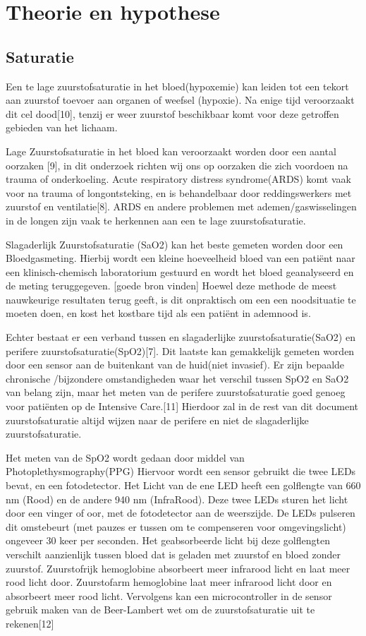 \documentclass[11pt]{article}
\begin{document}
    \section{Theorie en hypothese}\label{sec:theorie-en-hypothese}
    \subsection{Saturatie}
    Een te lage zuurstofsaturatie in het bloed(hypoxemie) kan leiden tot een tekort aan zuurstof toevoer aan organen of weefsel (hypoxie).
    Na enige tijd veroorzaakt dit cel dood[10], tenzij er weer zuurstof beschikbaar komt voor deze getroffen gebieden van het lichaam.

    Lage Zuurstofsaturatie in het bloed kan veroorzaakt worden door een aantal oorzaken [9], in dit onderzoek richten wij ons op oorzaken die zich voordoen na trauma of onderkoeling.
    Acute respiratory distress syndrome(ARDS) komt vaak voor na trauma of longontsteking, en is behandelbaar door reddingswerkers met zuurstof en ventilatie[8]. 
    ARDS en andere problemen met ademen/gaswisselingen in de longen zijn vaak te herkennen aan een te lage zuurstofsaturatie.

    Slagaderlijk Zuurstofsaturatie (SaO2) kan het beste gemeten worden door een Bloedgasmeting. 
    Hierbij wordt een kleine hoeveelheid bloed van een patiënt naar een klinisch-chemisch laboratorium gestuurd en wordt het bloed geanalyseerd en de meting teruggegeven. 
    [goede bron vinden] Hoewel deze methode de meest nauwkeurige resultaten terug geeft, is dit onpraktisch om een een noodsituatie  te moeten doen, en kost het kostbare tijd als een patiënt in ademnood is.

    Echter bestaat er een verband tussen en slagaderlijke zuurstofsaturatie(SaO2) en perifere zuurstofsaturatie(SpO2)[7]. 
    Dit laatste kan gemakkelijk gemeten worden door een sensor aan de buitenkant van de huid(niet invasief). 
    Er zijn bepaalde chronische /bijzondere omstandigheden waar het verschil tussen SpO2 en SaO2 van belang zijn, maar het meten van de perifere zuurstofsaturatie goed genoeg voor patiënten op de Intensive Care.[11] 
    Hierdoor zal in de rest van dit document zuurstofsaturatie altijd wijzen naar de perifere en niet de slagaderlijke zuurstofsaturatie.

    Het meten van de SpO2 wordt gedaan door middel van Photoplethysmography(PPG) Hiervoor wordt een sensor gebruikt die twee LEDs bevat, en een fotodetector. 
    Het Licht van de ene LED heeft een golflengte van 660 nm (Rood) en de andere 940 nm (InfraRood). Deze twee LEDs sturen het licht door een vinger of oor, met de fotodetector aan de weerszijde. 
    De LEDs pulseren dit omstebeurt (met pauzes er tussen om te compenseren voor omgevingslicht) ongeveer 30 keer per seconden. 
    Het geabsorbeerde licht bij deze golflengten verschilt aanzienlijk tussen bloed dat is geladen met zuurstof en bloed zonder zuurstof. 
    Zuurstofrijk hemoglobine absorbeert meer infrarood licht en laat meer rood licht door. Zuurstofarm hemoglobine laat meer infrarood licht door en absorbeert meer rood licht. 
    Vervolgens kan een microcontroller in de sensor gebruik maken van de Beer-Lambert wet om de zuurstofsaturatie uit te rekenen[12]
\end{document}
